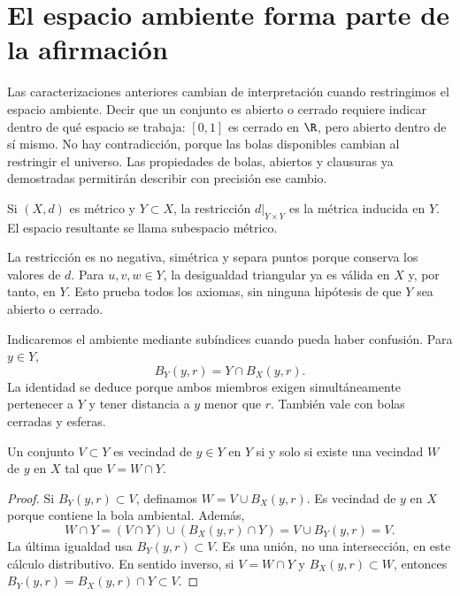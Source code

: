\section{El espacio ambiente forma parte de la afirmación}\label{lectura:04}
Las caracterizaciones anteriores cambian de interpretación cuando restringimos el espacio ambiente. Decir que un conjunto es abierto o cerrado requiere indicar dentro de qué espacio se trabaja: $[0,1]$ es cerrado en $\R$, pero abierto dentro de sí mismo. No hay contradicción, porque las bolas disponibles cambian al restringir el universo. Las propiedades de bolas, abiertos y clausuras ya demostradas permitirán describir con precisión ese cambio.

\begin{definicion}\label{ch04:subespacio}
Si $(X,d)$ es métrico y $Y\subset X$, la restricción $d|_{Y\times Y}$ es la métrica inducida en $Y$. El espacio resultante se llama subespacio métrico.
\end{definicion}
La restricción es no negativa, simétrica y separa puntos porque conserva los valores de $d$. Para $u,v,w\in Y$, la desigualdad triangular ya es válida en $X$ y, por tanto, en $Y$. Esto prueba todos los axiomas, sin ninguna hipótesis de que $Y$ sea abierto o cerrado.

Indicaremos el ambiente mediante subíndices cuando pueda haber confusión. Para $y\in Y$,
\begin{equation}\label{ch04:bolas}
B_Y(y,r)=Y\cap B_X(y,r).
\end{equation}
La identidad se deduce porque ambos miembros exigen simultáneamente pertenecer a $Y$ y tener distancia a $y$ menor que $r$. También vale con bolas cerradas y esferas.

\begin{proposicion}\label{ch04:vecindades}
Un conjunto $V\subset Y$ es vecindad de $y\in Y$ en $Y$ si y solo si existe una vecindad $W$ de $y$ en $X$ tal que $V=W\cap Y$.
\end{proposicion}
\begin{proof}
Si $B_Y(y,r)\subset V$, definamos $W=V\cup B_X(y,r)$. Es vecindad de $y$ en $X$ porque contiene la bola ambiental. Además,
\[
W\cap Y=(V\cap Y)\cup(B_X(y,r)\cap Y)
=V\cup B_Y(y,r)=V.
\]
La última igualdad usa $B_Y(y,r)\subset V$. Es una unión, no una intersección, en este cálculo distributivo. En sentido inverso, si $V=W\cap Y$ y $B_X(y,r)\subset W$, entonces $B_Y(y,r)=B_X(y,r)\cap Y\subset V$.
\end{proof}


